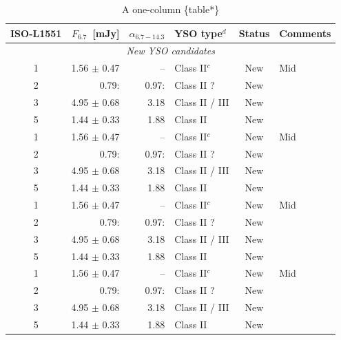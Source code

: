 \documentclass{aa}
\begin{document}
\begin{appendix}
\begin{table}[h!]
\caption {A one-column \{table*\} \newline}
\label{table:2} 
\centering
\begin{tabular}{crrlcl}
\hline\hline             
ISO-L1551 & $F_{6.7}$~[mJy] & $\alpha_{6.7-14.3}$
& YSO type$^{d}$ & Status & Comments\\
\hline
  \multicolumn{6}{c}{\it New YSO candidates}\\ %
\hline
  1 & 1.56 $\pm$ 0.47 & --    & Class II$^{c}$ & New & Mid\\
  2 & 0.79:           & 0.97: & Class II ?     & New & \\
  3 & 4.95 $\pm$ 0.68 & 3.18  & Class II / III & New & \\
  5 & 1.44 $\pm$ 0.33 & 1.88  & Class II       & New & \\
  1 & 1.56 $\pm$ 0.47 & --    & Class II$^{c}$ & New & Mid\\
  2 & 0.79:           & 0.97: & Class II ?     & New & \\
  3 & 4.95 $\pm$ 0.68 & 3.18  & Class II / III & New & \\
  5 & 1.44 $\pm$ 0.33 & 1.88  & Class II       & New & \\
  1 & 1.56 $\pm$ 0.47 & --    & Class II$^{c}$ & New & Mid\\
  2 & 0.79:           & 0.97: & Class II ?     & New & \\
  3 & 4.95 $\pm$ 0.68 & 3.18  & Class II / III & New & \\
  5 & 1.44 $\pm$ 0.33 & 1.88  & Class II       & New & \\
  1 & 1.56 $\pm$ 0.47 & --    & Class II$^{c}$ & New & Mid\\
  2 & 0.79:           & 0.97: & Class II ?     & New & \\
  3 & 4.95 $\pm$ 0.68 & 3.18  & Class II / III & New & \\
  5 & 1.44 $\pm$ 0.33 & 1.88  & Class II       & New & \\


\end{tabular}
\end{table}
\end{appendix}
\end{document}
